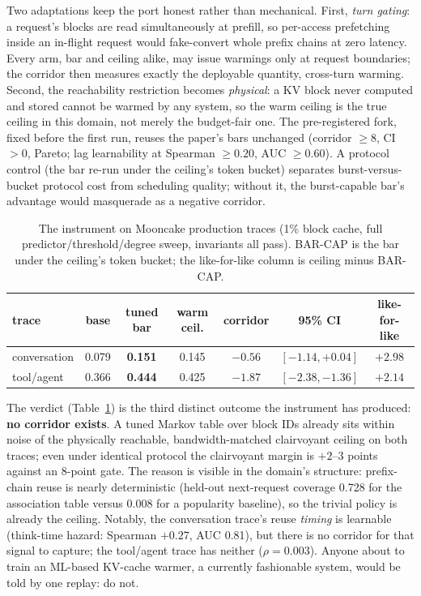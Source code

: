 \documentclass[11pt]{article}
\begin{document}
Two adaptations keep the port honest rather than mechanical. First, \emph{turn gating}: a request's blocks are read simultaneously at prefill, so per-access prefetching inside an in-flight request would fake-convert whole prefix chains at zero latency. Every arm, bar and ceiling alike, may issue warmings only at request boundaries; the corridor then measures exactly the deployable quantity, cross-turn warming. Second, the reachability restriction becomes \emph{physical}: a KV block never computed and stored cannot be warmed by any system, so the warm ceiling is the true ceiling in this domain, not merely the budget-fair one. The pre-registered fork, fixed before the first run, reuses the paper's bars unchanged (corridor $\geq8$, CI $>0$, Pareto; lag learnability at Spearman $\geq0.20$, AUC $\geq0.60$). A protocol control (the bar re-run under the ceiling's token bucket) separates burst-versus-bucket protocol cost from scheduling quality; without it, the burst-capable bar's advantage would masquerade as a negative corridor.

\begin{table}[t]\centering\footnotesize
\setlength{\tabcolsep}{3.5pt}
\caption{The instrument on Mooncake production traces (1\% block cache, full predictor/threshold/degree sweep, invariants all pass). BAR-CAP is the bar under the ceiling's token bucket; the like-for-like column is ceiling minus BAR-CAP.}
\label{tab:llm}
\begin{tabular}{lcccccc}
\toprule
trace & base & tuned bar & warm ceil. & corridor & 95\% CI & like-for-like \\
\midrule
conversation & 0.079 & \textbf{0.151} & 0.145 & $-0.56$ & $[-1.14,+0.04]$ & $+2.98$ \\
tool/agent & 0.366 & \textbf{0.444} & 0.425 & $-1.87$ & $[-2.38,-1.36]$ & $+2.14$ \\
\bottomrule
\end{tabular}
\end{table}

The verdict (Table~\ref{tab:llm}) is the third distinct outcome the instrument has produced: \textbf{no corridor exists}. A tuned Markov table over block IDs already sits within noise of the physically reachable, bandwidth-matched clairvoyant ceiling on both traces; even under identical protocol the clairvoyant margin is $+2$--$3$ points against an 8-point gate. The reason is visible in the domain's structure: prefix-chain reuse is nearly deterministic (held-out next-request coverage 0.728 for the association table versus 0.008 for a popularity baseline), so the trivial policy is already the ceiling. Notably, the conversation trace's reuse \emph{timing} is learnable (think-time hazard: Spearman $+0.27$, AUC 0.81), but there is no corridor for that signal to capture; the tool/agent trace has neither ($\rho{=}0.003$). Anyone about to train an ML-based KV-cache warmer, a currently fashionable system, would be told by one replay: do not.
\end{document}
